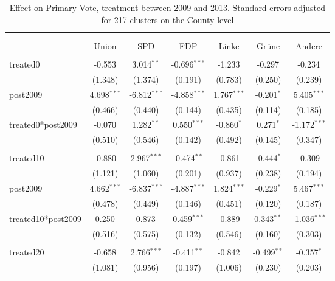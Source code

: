 \documentclass[12pt]{article}
\begin{document}
 
\begin{table}[!htbp] \centering
  \caption{Effect on Primary Vote, treatment between 2009 and 2013. Standard errors adjusted for 217 clusters on the County level}
\begin{tabular}{@{\extracolsep{5pt}}lcccccc}
\\[-1.8ex]\hline
\hline \\[-1.8ex]
\\[-1.8ex] & \multicolumn{1}{c}{Union} & \multicolumn{1}{c}{SPD} & \multicolumn{1}{c}{FDP} & \multicolumn{1}{c}{Linke} & \multicolumn{1}{c}{Grüne} & \multicolumn{1}{c}{Andere}  \\
\hline \\[-1.8ex]
 treated0 & -0.553$^{}$ & 3.014$^{**}$ & -0.696$^{***}$ & -1.233$^{}$ & -0.297$^{}$ & -0.234$^{}$ \\
  & (1.348) & (1.374) & (0.191) & (0.783) & (0.250) & (0.239) \\
 post2009 & 4.698$^{***}$ & -6.812$^{***}$ & -4.858$^{***}$ & 1.767$^{***}$ & -0.201$^{*}$ & 5.405$^{***}$ \\
  & (0.466) & (0.440) & (0.144) & (0.435) & (0.114) & (0.185) \\
 treated0*post2009 & -0.070$^{}$ & 1.282$^{**}$ & 0.550$^{***}$ & -0.860$^{*}$ & 0.271$^{*}$ & -1.172$^{***}$ \\
  & (0.510) & (0.546) & (0.142) & (0.492) & (0.145) & (0.347) \\
\hline \\[-1.8ex]
 treated10 & -0.880$^{}$ & 2.967$^{***}$ & -0.474$^{**}$ & -0.861$^{}$ & -0.444$^{*}$ & -0.309$^{}$ \\
  & (1.121) & (1.060) & (0.201) & (0.937) & (0.238) & (0.194) \\
 post2009 & 4.662$^{***}$ & -6.837$^{***}$ & -4.887$^{***}$ & 1.824$^{***}$ & -0.229$^{*}$ & 5.467$^{***}$ \\
  & (0.478) & (0.449) & (0.146) & (0.451) & (0.120) & (0.187) \\
 treated10*post2009 & 0.250$^{}$ & 0.873$^{}$ & 0.459$^{***}$ & -0.889$^{}$ & 0.343$^{**}$ & -1.036$^{***}$ \\
  & (0.516) & (0.575) & (0.132) & (0.546) & (0.160) & (0.303) \\
\hline \\[-1.8ex]
 treated20 & -0.658$^{}$ & 2.766$^{***}$ & -0.411$^{**}$ & -0.842$^{}$ & -0.499$^{**}$ & -0.357$^{*}$ \\
  & (1.081) & (0.956) & (0.197) & (1.006) & (0.230) & (0.203) \\

\end{tabular}
\end{table}
\end{document}
